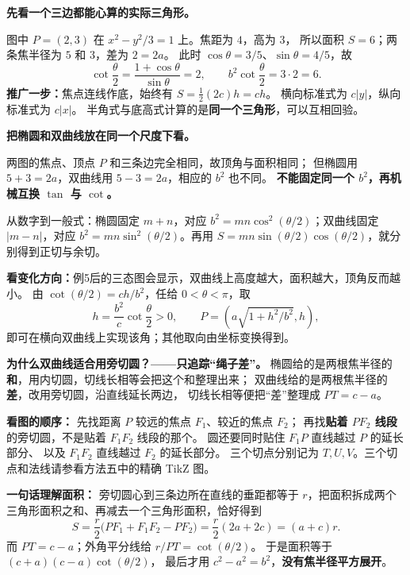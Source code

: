 \begin{explanationbox}
\textbf{先看一个三边都能心算的实际三角形。}
\begin{center}\end{center}
图中 $P=(2,3)$ 在 $x^2-y^2/3=1$ 上。焦距为 $4$，高为 $3$，
所以面积 $S=6$；两条焦半径为 $5$ 和 $3$，差为 $2=2a$。
此时 $\cos\theta=3/5$、$\sin\theta=4/5$，故
\[
 \cot\frac\theta2=\frac{1+\cos\theta}{\sin\theta}=2,
 \qquad b^2\cot\frac\theta2=3\cdot2=6.
\]
\textbf{推广一步：}焦点连线作底，始终有 $S=\tfrac12(2c)h=ch$。
横向标准式为 $c|y|$，纵向标准式为 $c|x|$。
半角式与底高式计算的是\textbf{同一个三角形}，可以互相回验。
\end{explanationbox}
\clearpage
\begin{explanationbox}
\textbf{把椭圆和双曲线放在同一个尺度下看。}

两图的焦点、顶点 $P$ 和三条边完全相同，故顶角与面积相同；
但椭圆用 $5+3=2a$，双曲线用 $5-3=2a$，相应的 $b^2$ 也不同。
\textbf{不能固定同一个 $b^2$，再机械互换 $\tan$ 与 $\cot$。}

从数字到一般式：椭圆固定 $m+n$，对应
$b^2=mn\cos^2(\theta/2)$；双曲线固定 $|m-n|$，对应
$b^2=mn\sin^2(\theta/2)$。再用
$S=mn\sin(\theta/2)\cos(\theta/2)$，就分别得到正切与余切。

\textbf{看变化方向：}例5后的三态图会显示，双曲线上高度越大，面积越大，顶角反而越小。
由 $\cot(\theta/2)=ch/b^2$，任给 $0<\theta<\pi$，取
\[
 h=\frac{b^2}{c}\cot\frac\theta2>0,\qquad
 P=\left(a\sqrt{1+h^2/b^2},h\right),
\]
即可在横向双曲线上实现该角；其他取向由坐标变换得到。
\end{explanationbox}
\clearpage

\clearpage
\begin{explanationbox}
\textbf{为什么双曲线适合用旁切圆？——只追踪“绳子差”。}
椭圆给的是两根焦半径的\textbf{和}，用内切圆，切线长相等会把这个和整理出来；
双曲线给的是两根焦半径的\textbf{差}，改用旁切圆，沿直线延长两边，
切线长相等便把“差”整理成 $PT=c-a$。

\textbf{看图的顺序：}
先找距离 $P$ 较远的焦点 $F_1$、较近的焦点 $F_2$；
再找\textbf{贴着 $PF_2$ 线段}的旁切圆，不是贴着 $F_1F_2$ 线段的那个。
圆还要同时贴住 $F_1P$ 直线越过 $P$ 的延长部分、
以及 $F_1F_2$ 直线越过 $F_2$ 的延长部分。
三个切点分别记为 $T,U,V$。三个切点和法线请参看方法五中的精确 TikZ 图。

\textbf{一句话理解面积：}
旁切圆心到三条边所在直线的垂距都等于 $r$，把面积拆成两个三角形面积之和、再减去一个三角形面积，恰好得到
\[
 S=\frac r2\bigl(PF_1+F_1F_2-PF_2\bigr)
   =\frac r2(2a+2c)=(a+c)r.
\]
而 $PT=c-a$；外角平分线给 $r/ PT=\cot(\theta/2)$。
于是面积等于 $(c+a)(c-a)\cot(\theta/2)$，
最后才用 $c^2-a^2=b^2$，\textbf{没有焦半径平方展开}。
\end{explanationbox}
